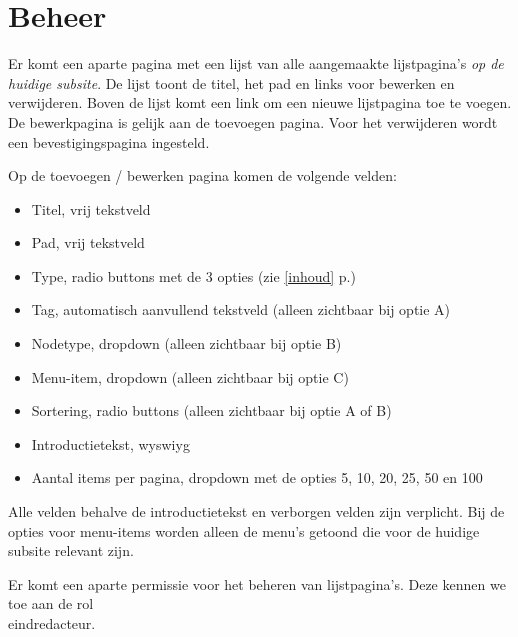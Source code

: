 \documentclass{article}
\newcommand{\see}[1]{ (zie \ref{#1} p.\pageref{#1})}
\begin{document}
\section{Beheer}

Er komt een aparte pagina met een lijst van alle aangemaakte lijstpagina's \emph{op de huidige subsite}. De lijst toont de titel, het pad en links voor bewerken en verwijderen. Boven de lijst komt een link om een nieuwe lijstpagina toe te voegen. De bewerkpagina is gelijk aan de toevoegen pagina. Voor het verwijderen wordt een bevestigingspagina ingesteld.

Op de toevoegen / bewerken pagina komen de volgende velden:
\begin{itemize}
\item Titel, vrij tekstveld
\item Pad, vrij tekstveld
\item Type, radio buttons met de 3 opties\see{inhoud}
\item Tag, automatisch aanvullend tekstveld (alleen zichtbaar bij optie A)
\item Nodetype, dropdown (alleen zichtbaar bij optie B)
\item Menu-item, dropdown (alleen zichtbaar bij optie C)
\item Sortering, radio buttons (alleen zichtbaar bij optie A of B)
\item Introductietekst, wyswiyg
\item Aantal items per pagina, dropdown met de opties 5, 10, 20, 25, 50 en 100
\end{itemize}
Alle velden behalve de introductietekst en verborgen velden zijn verplicht. Bij de opties voor menu-items worden alleen de menu's getoond die voor de huidige subsite relevant zijn.

Er komt een aparte permissie voor het beheren van lijstpagina's. Deze kennen we toe aan de rol \\ eindredacteur.
\end{document}
